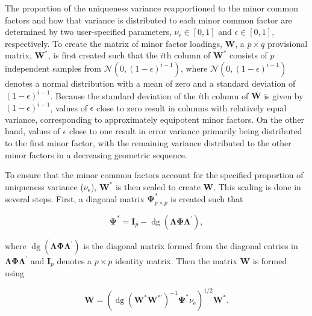 \documentclass[11pt]{umnthesis}
\DeclareMathOperator{\dg}{\textrm{dg}}
\begin{document}
The proportion of the uniqueness variance reapportioned to the minor common factors and how that variance is distributed to each minor common factor are determined by two user-specified parameters, \(\nu_{\textrm{e}} \in [0,1]\) and \(\epsilon \in [0,1]\), respectively. To create the matrix of minor factor loadings, \(\mathbf{W}\), a \(p \times q\) provisional matrix, \(\mathbf{W}^*\), is first created such that the \(i\)th column of \(\mathbf{W}^*\) consists of \(p\) independent samples from \(\mathcal{N}(0, (1 - \epsilon)^{i-1})\), where \(\mathcal{N}(0, (1 - \epsilon)^{i-1})\) denotes a normal distribution with a mean of zero and a standard deviation of \((1 - \epsilon)^{i-1}\). Because the standard deviation of the \(i\)th column of \(\mathbf{W}\) is given by \((1 - \epsilon)^{i - 1}\), values of \(\epsilon\) close to zero result in columns with relatively equal variance, corresponding to approximately equipotent minor factors. On the other hand, values of \(\epsilon\) close to one result in error variance primarily being distributed to the first minor factor, with the remaining variance distributed to the other minor factors in a decreasing geometric sequence.

To ensure that the minor common factors account for the specified proportion of uniqueness variance (\(\nu_{\textrm{e}}\)), \(\mathbf{W}^*\) is then scaled to create \(\mathbf{W}\). This scaling is done in several steps. First, a diagonal matrix \(\bm{\Psi}^*_{p \times p}\) is created such that

\begin{equation}
\bm{\Psi}^* = \mathbf{I}_p - \dg(\bm{\Lambda} \bm{\Phi} \bm{\Lambda}^\prime),
\label{eq:psi-star}
\end{equation}

\noindent where \(\dg(\bm{\Lambda}\bm{\Phi}\bm{\Lambda}^\prime)\) is the diagonal matrix formed from the diagonal entries in \(\bm{\Lambda}\bm{\Phi}\bm{\Lambda}^\prime\) and \(\mathbf{I}_p\) denotes a \(p \times p\) identity matrix. Then the matrix \(\mathbf{W}\) is formed using

\begin{equation}
\mathbf{W} = (\dg(\mathbf{W}^* \mathbf{W}^{* \prime})^{-1} \bm{\Psi}^* \nu_{\textrm{e}})^{1/2} \mathbf{W}^*.
\label{eq:W-matrix}
\end{equation}
\end{document}
